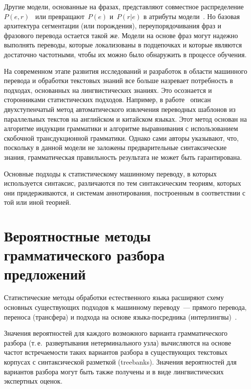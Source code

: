 \begin{multicols}{2}
      Другие модели, основанные на фразах, пред\-став\-ля\-ют совместное 
распределение~$P(e,r)$~\cite{20koz} или превращают~$P(e)$ и~$P(r\vert e)$ 
в атрибуты модели~\cite{21koz}. Но базовая архитектура сегментации (или 
по\-рож\-де\-ния), переупорядочивания фраз и фразового перевода остается такой 
же. Модели на основе фраз могут надежно выполнять переводы, которые 
локализованы в подцепочках и которые являются достаточно частотными, 
чтобы их можно было обнаружить в процессе обучения.
     
     На современном этапе развития исследований и разработок в области 
машинного перевода и обработки текстовых знаний все больше назревает\linebreak 
потребность в подходах, основанных на линг\-висти\-че\-ских знаниях. Это 
осознается и сторонниками\- статистических подходов. Например, в 
работе~\cite{22koz} описан двухступенчатый метод автоматического 
извлечения переводных шаблонов из параллельных текстов на английском и 
китайском языках. Этот метод основан на алгоритме индукции грамматики и 
алгоритме выравнивания с использованием скобочной трансдукционной 
грамматики. Однако сами авторы указывают, что, поскольку в данной 
модели не заложены предварительные синтаксические знания, 
грамматическая правильность результата не может быть гарантирована.
      
      Основные подходы к статистическому машинному переводу, в 
которых используется синтаксис, различаются по тем синтаксическим 
теориям, которых они придерживаются, и системам аннотирования, 
построенным в соответствии с той или иной теорией. 
      
\vspace*{6pt}
\section{Вероятностные методы грамматического разбора 
предложений}
\vspace*{3pt}
     
     Статистические методы обработки естественного языка расширяют 
схему основных суще\-ст\-ву\-ющих подходов к машинному переводу~--- 
прямого перевода, переноса (трансфера) и подхода на основе 
     языка-посредника (интерлингвы)~\cite{23koz, 24koz}. 
     
     Значения вероятностей для каждого возможного варианта 
грамматического разбора (т.\,е.\ развертывания нетерминального узла) 
вычисляются на основе частот встречаемости таких вариантов разбора в 
существующих текстовых корпусах с синтаксической разметкой (treebanks). 
Значения вероятностей для вариантов разбора могут быть также получены и 
в виде лингвистических экспертных оценок.
     

\end{multicols}
